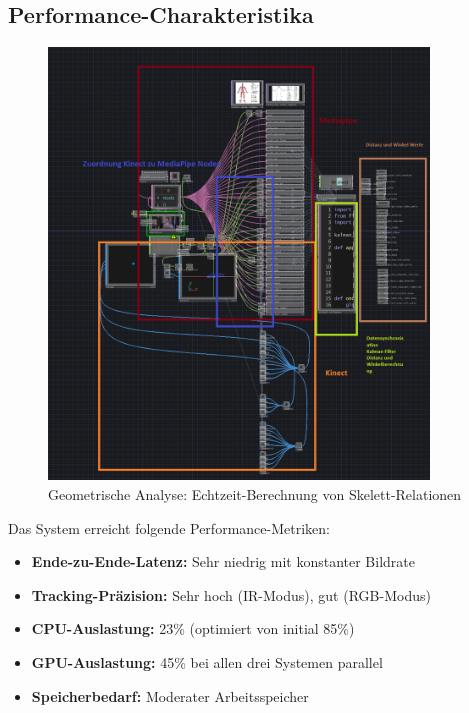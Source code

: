 \subsection*{Performance-Charakteristika}

\begin{figure}[h]
    \centering
    \includegraphics[width=0.9\textwidth]{images/docupictures/KinectMediaPipe_Testing.png}
    \caption{Geometrische Analyse: Echtzeit-Berechnung von Skelett-Relationen}
    \label{fig:distance_angle}
\end{figure}

Das System erreicht folgende Performance-Metriken:
\begin{itemize}
    \item \textbf{Ende-zu-Ende-Latenz:} Sehr niedrig mit konstanter Bildrate
    \item \textbf{Tracking-Präzision:} Sehr hoch (IR-Modus), gut (RGB-Modus)
    \item \textbf{CPU-Auslastung:} 23\% (optimiert von initial 85\%)
    \item \textbf{GPU-Auslastung:} 45\% bei allen drei Systemen parallel
    \item \textbf{Speicherbedarf:} Moderater Arbeitsspeicher
\end{itemize}

